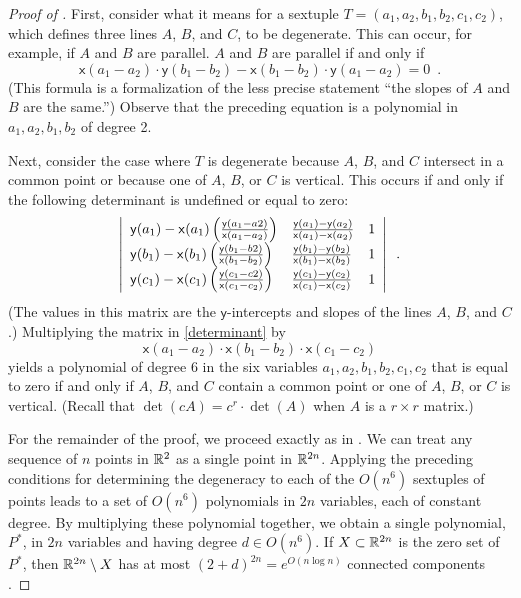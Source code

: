 \documentclass{patmorin}
\newcommand{\x}{\mathsf{x}}
\newcommand{\y}{\mathsf{y}}
\begin{document}
\begin{proof}[Proof of ]
   First, consider what it means for a sextuple
   $T=(a_1,a_2,b_1,b_2,c_1,c_2)$, which defines three lines $A$, $B$,
   and $C$, to be degenerate.  This can occur, for example, if $A$
   and $B$ are parallel.  $A$ and $B$ are parallel if and only if
   \[
      \x(a_1-a_2)\cdot \y(b_1-b_2) - 
       \x(b_1-b_2)\cdot \y(a_1-a_2) = 0 \enspace .
   \]
   (This formula is a formalization of the less precise statement
   ``the slopes of $A$ and $B$ are the same.'')
   Observe that the preceding equation is a polynomial in
   $a_1,a_2,b_1,b_2$ of degree 2.

   Next, consider the case where $T$ is degenerate because $A$, $B$, and
   $C$ intersect in a common point or because one of $A$, $B$, or $C$
   is vertical.  This occurs if and only if the following determinant
   is undefined or equal to zero:
   \begin{equation}
   \left|\begin{array}{lll}
   \y(a_1)-\x(a_1)\left(\frac{\y(a_1-a2)}{\x(a_1-a_2)}\right) & \frac{\y(a_1)-\y(a_2)}{\x(a_1)-\x(a_2)} & 1 \\
   \y(b_1)-\x(b_1)\left(\frac{\y(b_1-b2)}{\x(b_1-b_2)}\right) & \frac{\y(b_1)-\y(b_2)}{\x(b_1)-\x(b_2)}  & 1 \\
   \y(c_1)-\x(c_1)\left(\frac{\y(c_1-c2)}{\x(c_1-c_2)}\right) & \frac{\y(c_1)-\y(c_2)}{\x(c_1)-\x(c_2)}  & 1 \\
   \end{array}\right| \enspace .
   \eqlabel{determinant}
   \end{equation}
   (The values in this matrix are the $\y$-intercepts and slopes of the
   lines $A$, $B$, and $C$.)
   Multiplying the matrix in \eqref{determinant} by 
   \[
      \x(a_1-a_2)\cdot
      \x(b_1-b_2)\cdot
      \x(c_1-c_2)
   \]
   yields a polynomial of degree $6$ in the six variables
   $a_1,a_2,b_1,b_2,c_1,c_2$ that is equal to zero if and only if $A$,
   $B$, and $C$ contain a common point or one of $A$, $B$, or $C$
   is vertical. (Recall that $\det(cA)=c^r\cdot\det(A)$ when $A$ is a
   $r\times r$ matrix.)

   For the remainder of the proof, we proceed exactly as in
   \cite{goodman.pollack:upper}.  We can treat any sequence of $n$ points
   in $\mathbb{R}^2$ as a single point in $\mathbb{R}^{2n}$.  Applying the preceding
   conditions for determining the degeneracy to each of the $O(n^6)$
   sextuples of points leads to a set of $O(n^6)$ polynomials in $2n$
   variables, each of constant degree.  By multiplying these polynomial
   together, we obtain a single polynomial, $P^*$, in $2n$ variables and
   having degree $d\in O(n^6)$.  If $X\subset\mathbb{R}^{2n}$ is the zero set of
   $P^*$, then $\mathbb{R}^{2n}\setminus X$ has at most $(2+d)^{2n}=e^{O(n\log
   n)}$ connected components \cite[Lemma~2]{goodman.pollack:upper}.


\end{proof}
\end{document}
